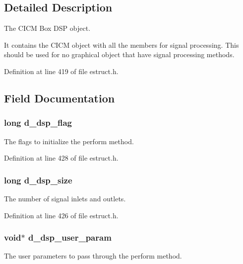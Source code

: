 \subsection{Detailed Description}
The C\-I\-C\-M Box D\-S\-P object. 

It contains the C\-I\-C\-M object with all the members for signal processing. This should be used for no graphical object that have signal processing methods. 

Definition at line 419 of file estruct.\-h.



\subsection{Field Documentation}
\hypertarget{struct__edspobj_af3409f354253e5753dbba6b22472972e}{
\subsubsection[{d\-\_\-dsp\-\_\-flag}]{\setlength{\rightskip}{0pt plus 5cm}long d\-\_\-dsp\-\_\-flag}}\label{struct__edspobj_af3409f354253e5753dbba6b22472972e}
The flags to initialize the perform method. 

Definition at line 428 of file estruct.\-h.

\hypertarget{struct__edspobj_a0bb016ebe02ce3d3a0965a19c1d8476d}{
\subsubsection[{d\-\_\-dsp\-\_\-size}]{\setlength{\rightskip}{0pt plus 5cm}long d\-\_\-dsp\-\_\-size}}\label{struct__edspobj_a0bb016ebe02ce3d3a0965a19c1d8476d}
The number of signal inlets and outlets. 

Definition at line 426 of file estruct.\-h.

\hypertarget{struct__edspobj_ab056760f93f95b4edc3a8dddd0b5b62f}{
\subsubsection[{d\-\_\-dsp\-\_\-user\-\_\-param}]{\setlength{\rightskip}{0pt plus 5cm}void$\ast$ d\-\_\-dsp\-\_\-user\-\_\-param}}\label{struct__edspobj_ab056760f93f95b4edc3a8dddd0b5b62f}
The user parameters to pass through the perform method. 

